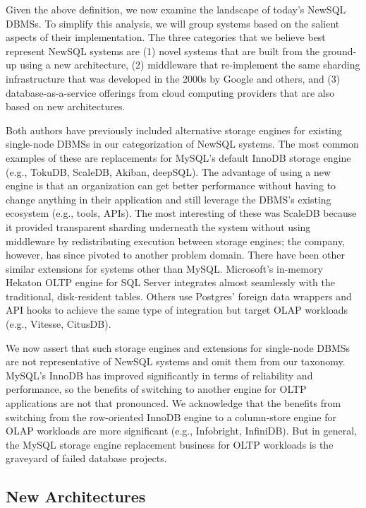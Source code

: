 \documentclass[a4paper,12pt,notitlepage,twoside,openright]{article}
\begin{document}
Given the above definition, we now examine the landscape of today's
NewSQL DBMSs. To simplify this analysis, we will group systems based on
the salient aspects of their implementation. The three categories that
we believe best represent NewSQL systems are (1) novel systems that are
built from the ground-up using a new architecture, (2) middleware that
re-implement the same sharding infrastructure that was developed in the
2000s by Google and others, and (3) database-as-a-service offerings from
cloud computing providers that are also based on new architectures.

Both authors have previously included alternative storage engines for
existing single-node DBMSs in our categorization of NewSQL systems. The
most common examples of these are replacements for MySQL's default
InnoDB storage engine (e.g., TokuDB, ScaleDB, Akiban, deepSQL). The
advantage of using a new engine is that an organization can get better
performance without having to change anything in their application and
still leverage the DBMS's existing ecosystem (e.g., tools, APIs). The
most interesting of these was ScaleDB because it provided transparent
sharding underneath the system without using middleware by
redistributing execution between storage engines; the company, however,
has since pivoted to another problem domain. There have been other
similar extensions for systems other than MySQL. Microsoft's in-memory
Hekaton OLTP engine for SQL Server integrates almost seamlessly with the
traditional, disk-resident tables. Others use Postgres' foreign data
wrappers and API hooks to achieve the same type of integration but
target OLAP workloads (e.g., Vitesse, CitusDB).

We now assert that such storage engines and extensions for single-node
DBMSs are not representative of NewSQL systems and omit them from our
taxonomy. MySQL's InnoDB has improved significantly in terms of
reliability and performance, so the benefits of switching to another
engine for OLTP applications are not that pronounced. We acknowledge
that the benefits from switching from the row-oriented InnoDB engine to
a column-store engine for OLAP workloads are more significant (e.g.,
Infobright, InfiniDB). But in general, the MySQL storage engine
replacement business for OLTP workloads is the graveyard of failed
database projects.

\hypertarget{new-architectures}{%
\subsection{New Architectures}\label{new-architectures}}
\end{document}
